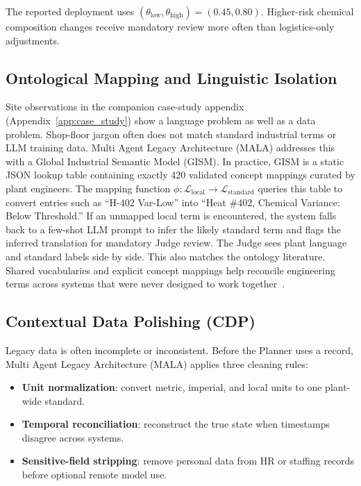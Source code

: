 \documentclass[conference]{IEEEtran}
\newcommand{\MALA}{Multi Agent Legacy Architecture (MALA)}
\begin{document}
The reported deployment uses $(\theta_{\text{low}}, \theta_{\text{high}}) = (0.45, 0.80)$. Higher-risk chemical composition changes receive mandatory review more often than logistics-only adjustments.

\subsection{Ontological Mapping and Linguistic Isolation}

Site observations in the companion case-study appendix (Appendix~\ref{app:case_study}) show a language problem as well as a data problem. Shop-floor jargon often does not match standard industrial terms or LLM training data. \MALA{} addresses this with a Global Industrial Semantic Model (GISM). In practice, GISM is a static JSON lookup table containing exactly 420 validated concept mappings curated by plant engineers. The mapping function $\phi: \mathcal{L}_{\text{local}} \rightarrow \mathcal{L}_{\text{standard}}$ queries this table to convert entries such as ``H-402 Var-Low'' into ``Heat \#402, Chemical Variance: Below Threshold.'' If an unmapped local term is encountered, the system falls back to a few-shot LLM prompt to infer the likely standard term and flags the inferred translation for mandatory Judge review. The Judge sees plant language and standard labels side by side. This also matches the ontology literature. Shared vocabularies and explicit concept mappings help reconcile engineering terms across systems that were never designed to work together~\cite{fogliatto2020}.

\subsection{Contextual Data Polishing (CDP)}

Legacy data is often incomplete or inconsistent. Before the Planner uses a record, \MALA{} applies three cleaning rules:
\begin{itemize}
  \item \textbf{Unit normalization}: convert metric, imperial, and local units to one plant-wide standard.
  \item \textbf{Temporal reconciliation}: reconstruct the true state when timestamps disagree across systems.
  \item \textbf{Sensitive-field stripping}: remove personal data from HR or staffing records before optional remote model use.
\end{itemize}
\end{document}
